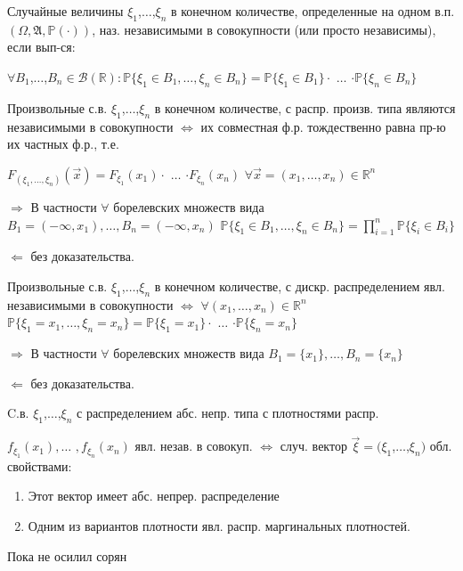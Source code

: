 \begin{defs}
	Случайные величины $\xi_1$,$\dots$,$\xi_n$ в конечном количестве, определенные на одном в.п. $(\Omega,\mathfrak{A},\mathbb{P}(\cdot))$, наз. независимыми
	в совокупности (или просто независимы), если вып-ся:
	
	$\forall B_1$,$\dots$,$B_n \in \mathcal{B}(\mathbb{R}) : \mathbb{P}\{\xi_1 \in B_1,\dots,\xi_n \in B_n\} = \mathbb{P}\{\xi_1 \in B_1\}\cdot$ $\dots$ $\cdot \mathbb{P}\{\xi_n \in B_n\}$
\end{defs}

\begin{proofs}
	Произвольные с.в. $\xi_1$,$\dots$,$\xi_n$ в конечном количестве, с распр. произв. типа являются
	независимыми в совокупности $\iff$ их совместная ф.р. тождественно равна пр-ю их частных ф.р., т.е.
	
	$F_{(\xi_1, \dots , \xi_n)}(\overrightarrow{x}) = F_{\xi_1}(x_1) \cdot$ $\dots$ $\cdot F_{\xi_n}(x_n)$ $\forall \overrightarrow{x} = (x_1,\ldots,x_n) \in \mathbb{R}^n$
	\begin{dokvo}
	
		$\Rightarrow$ В частности $\forall$ борелевских множеств вида $B_1 = (-\infty, x_1), \ldots, B_n = (-\infty, x_n)$ $\mathbb{P}\{\xi_1 \in B_1,\dots,\xi_n \in B_n\} = \prod\limits_{i=1}^{n}\mathbb{P}\{\xi_i \in B_i\}$
		
		$\Leftarrow$ без доказательства.
	\end{dokvo}
\end{proofs}

\begin{proofs}
	Произвольные с.в. $\xi_1$,$\dots$,$\xi_n$ в конечном количестве, с дискр. распределением явл. независимыми в совокупности $\iff$
	$\forall (x_1,\ldots,x_n) \in \mathbb{R}^n$ $\mathbb{P}\{\xi_1 = x_1,\dots,\xi_n = x_n\} = \mathbb{P}\{\xi_1 = x_1\}\cdot$ $\dots$ $\cdot \mathbb{P}\{\xi_n = x_n\}$
	\begin{dokvo}
	
		$\Rightarrow$ В частности $\forall$ борелевских множеств вида $B_1 = \{x_1\}, \ldots, B_n = \{x_n\}$
		
		$\Leftarrow$ без доказательства.
	\end{dokvo}
\end{proofs}

\begin{proofs}
	C.в. $\xi_1$,$\dots$,$\xi_n$ с распределением абс. непр. типа с плотностями распр. 
	
	$f_{\xi_1}(x_1),\ldots$ $,f_{\xi_n}(x_n)$ явл. незав. в совокуп. $\iff$ случ. вектор
	$\overrightarrow{\xi} = (\xi_1$,$\dots$,$\xi_n)$ обл. свойствами:
	\begin{enumerate}
		\item Этот вектор имеет абс. непрер. распределение
		\item Одним из вариантов плотности явл. распр. маргинальных плотностей.
	\end{enumerate}
	\begin{dokvo}
		Пока не осилил сорян
	\end{dokvo}
\end{proofs}

